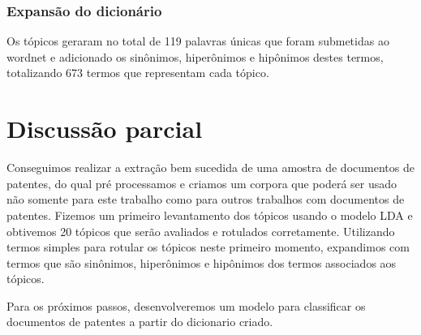 \subsubsection{Expansão do dicionário}

Os tópicos geraram no total de 119 palavras únicas que foram submetidas ao wordnet e adicionado os sinônimos, hiperônimos e hipônimos destes termos, totalizando 673 termos que representam cada tópico.

\section{Discussão parcial}

Conseguimos realizar a extração bem sucedida de uma amostra de documentos de patentes, do qual pré processamos e criamos um corpora que poderá ser usado não somente para este trabalho como para outros trabalhos com documentos de patentes. Fizemos um primeiro levantamento dos tópicos usando o modelo LDA e obtivemos 20 tópicos que serão avaliados e rotulados corretamente. 
Utilizando termos simples para rotular os tópicos neste primeiro momento, expandimos com termos que são sinônimos, hiperônimos e hipônimos dos termos associados aos tópicos. 

Para os próximos passos, desenvolveremos um modelo para classificar os documentos de patentes a partir do dicionario criado. 

